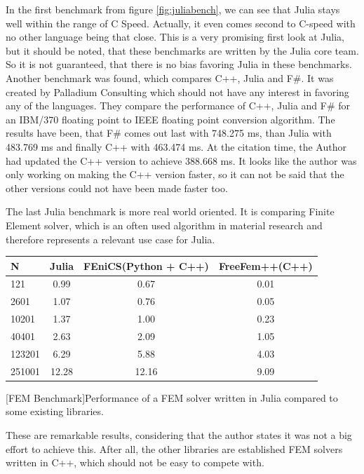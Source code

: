 In the first benchmark from figure \ref{fig:juliabench}, we can see that Julia stays well within the range of C Speed. 
Actually, it even comes second to C-speed with no other language being that close.
This is a very promising first look at Julia, but it should be noted, that these benchmarks are written by the Julia core team.
So it is not guaranteed, that there is no bias favoring Julia in these benchmarks.
Another benchmark was found, which compares C++, Julia and F\#. It was created by Palladium Consulting which should not have any interest in favoring any of the languages.
They compare the performance of C++, Julia and F\# for an IBM/370 floating point to IEEE floating point conversion algorithm.
The results\cite{JuliaFSCpp} have been, that F\# comes out last with 748.275 ms, than Julia with 483.769 ms and finally C++ with 463.474 ms. 
At the citation time, the Author had updated the C++ version to achieve 388.668 ms. 
It looks like the author was only working on making the C++ version faster, so it can not be said that the other versions could not have been made faster too.

The last Julia benchmark is more real world oriented. 
It is comparing Finite Element solver, which is an often used algorithm in material research and therefore represents a relevant use case for Julia.

\begin{table}[htbp]
    \centering
    \begin{tabular}{l|c|c|c}
        \hline
        \textbf{N}  & \textbf{Julia} & \textbf{FEniCS(Python + C++)}  & \textbf{FreeFem++(C++)}\\
        \hline
        121         & 0.99           & 0.67             & 0.01 \\
        2601        & 1.07           & 0.76             & 0.05 \\
        10201       & 1.37           & 1.00             & 0.23 \\
        40401       & 2.63           & 2.09             & 1.05 \\
        123201      & 6.29           & 5.88             & 4.03 \\
        251001      & 12.28          & 12.16            & 9.09 \\
        \hline
    \end{tabular}
    [FEM Benchmark]{Performance of a FEM solver written in Julia compared to some existing libraries. \cite{FMSolver}}
    \label{table:fembench}
\end{table}
These are remarkable results, considering that the author states it was not a big effort to achieve this. After all, the other libraries are established FEM solvers written in C++, which should not be easy to compete with.

